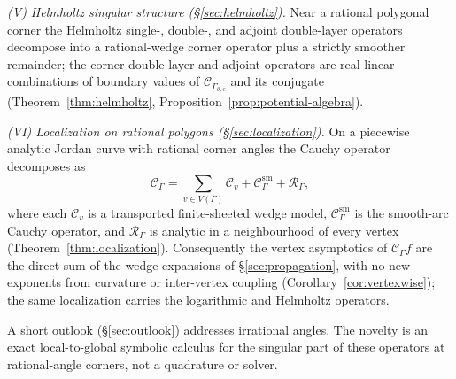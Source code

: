 \documentclass[pdflatex,sn-mathphys-num]{sn-jnl}%
\newcommand{\Cau}{\mathcal{C}}
\newcommand{\Gw}{\Gamma_{\theta,c}}
\theoremstyle{thmstyleone}
\theoremstyle{thmstyletwo}
\theoremstyle{thmstylethree}
\begin{document}
\emph{(V) Helmholtz singular structure (\S\ref{sec:helmholtz}).} Near a rational
polygonal corner the Helmholtz single-, double-, and adjoint double-layer
operators decompose into a rational-wedge corner operator plus a strictly
smoother remainder; the corner double-layer and adjoint operators are
real-linear combinations of boundary values of $\Cau_{\Gw}$ and its conjugate
(Theorem~\ref{thm:helmholtz}, Proposition~\ref{prop:potential-algebra}).

\emph{(VI) Localization on rational polygons (\S\ref{sec:localization}).} On a
piecewise analytic Jordan curve with rational corner angles the Cauchy operator
decomposes as
\[
  \Cau_\Gamma=\sum_{v\in V(\Gamma)}\Cau_v+\Cau_\Gamma^{\mathrm{sm}}+\mathcal R_\Gamma,
\]
where each $\Cau_v$ is a transported finite-sheeted wedge model, $\Cau_\Gamma^{\mathrm{sm}}$
is the smooth-arc Cauchy operator, and $\mathcal R_\Gamma$ is analytic in a
neighbourhood of every vertex (Theorem~\ref{thm:localization}). Consequently the
vertex asymptotics of $\Cau_\Gamma f$ are the direct sum of the wedge expansions
of \S\ref{sec:propagation}, with no new exponents from curvature or inter-vertex
coupling (Corollary~\ref{cor:vertexwise}); the same localization carries the
logarithmic and Helmholtz operators.

A short outlook (\S\ref{sec:outlook}) addresses irrational angles. The novelty is
an exact local-to-global symbolic calculus for the singular part of these
operators at rational-angle corners, not a quadrature or solver.
\end{document}
